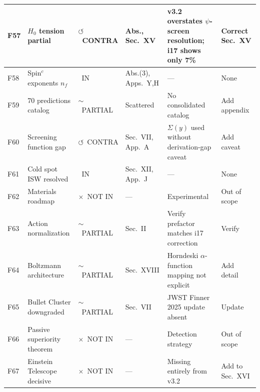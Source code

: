 \documentclass[11pt,a4paper]{article}
\newcommand{\vin}{\textcolor{statusIN}{\checkmark~IN}}
\newcommand{\vpartial}{\textcolor{statusPARTIAL}{$\sim$~PARTIAL}}
\newcommand{\vnot}{\textcolor{statusNOT}{$\times$~NOT IN}}
\newcommand{\vcontra}{\textcolor{statusCONTRA}{$\circlearrowleft$~CONTRA}}
\begin{document}
{\begin{longtable}{|p{0.5cm}|p{4.8cm}|p{1.6cm}|p{2.5cm}|p{4.5cm}|p{1.8cm}|}
\hline
\rowcolor{technical!8}
F57 & $H_0$ tension partial & \vcontra & Abs., Sec.~XV & v3.2 overstates $\psi$-screen resolution; i17 shows only 7\% & Correct Sec.~XV \\
\hline
\rowcolor{technical!8}
F58 & Spin$^c$ exponents $n_f$ & \vin & Abs.(3), Apps.~Y,H & --- & None \\
\hline
\rowcolor{technical!8}
F59 & 70 predictions catalog & \vpartial & Scattered & No consolidated catalog & Add appendix \\
\hline
\rowcolor{technical!8}
F60 & Screening function gap & \vcontra & Sec.~VII, App.~A & $\Sigma(y)$ used without derivation-gap caveat & Add caveat \\
\hline
\rowcolor{technical!8}
F61 & Cold spot ISW resolved & \vin & Sec.~XII, App.~J & --- & None \\
\hline
\rowcolor{technical!8}
F62 & Materials roadmap & \vnot & --- & Experimental & Out of scope \\
\hline
\rowcolor{technical!8}
F63 & Action normalization & \vpartial & Sec.~II & Verify prefactor matches i17 correction & Verify \\
\hline
\rowcolor{technical!8}
F64 & Boltzmann architecture & \vpartial & Sec.~XVIII & Horndeski $\alpha$-function mapping not explicit & Add detail \\
\hline
\rowcolor{technical!8}
F65 & Bullet Cluster downgraded & \vpartial & Sec.~VII & JWST Finner 2025 update absent & Update \\
\hline
\rowcolor{technical!8}
F66 & Passive superiority theorem & \vnot & --- & Detection strategy & Out of scope \\
\hline
\rowcolor{technical!8}
F67 & Einstein Telescope decisive & \vnot & --- & Missing entirely from v3.2 & Add to Sec.~XVI \\
\hline


\end{longtable}}
\end{document}
